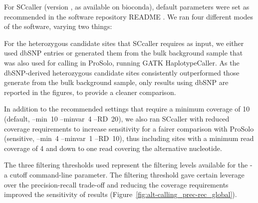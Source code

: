 \documentclass[authoryear,preprint,11pt]{scrartcl}
\begin{document}
For SCcaller (version {}, as available on bioconda), default parameters were set as recommended in the software repository README \citep{dong_sccaller_2018}.
We ran four different modes of the software, varying two things:
\begin{enumerate*}
 \item For the heterozygous candidate sites that SCcaller requires as input, we either used dbSNP \citep{sherry_dbsnp:_2001,ncbi_database_2016} entries or generated them from the bulk background sample that was also used for calling in ProSolo, running GATK HaplotypeCaller.
 As the dbSNP-derived heterozygous candidate sites consistently outperformed those generate from the bulk background sample, only results using dbSNP are reported in the figures, to provide a cleaner comparison.
 \item In addition to the recommended settings that require a minimum coverage of 10 (default, {\ttfamily --min~10 --minvar~4 --RD~20}), we also ran SCcaller with reduced coverage requirements to increase sensitivity for a fairer comparison with ProSolo (sensitive, {\ttfamily --min~4 --minvar~1 --RD~10}), thus including sites with a minimum read coverage of 4 and down to one read covering the alternative nucleotide.
\end{enumerate*}
The three filtering thresholds used represent the filtering levels available for the {\ttfamily -a cutoff} command-line parameter.
The filtering threshold gave certain leverage over the precision-recall trade-off and reducing the coverage requirements improved the sensitivity of results (Figure~\ref{fig:alt-calling_prec-rec_global}).\\
\end{document}
